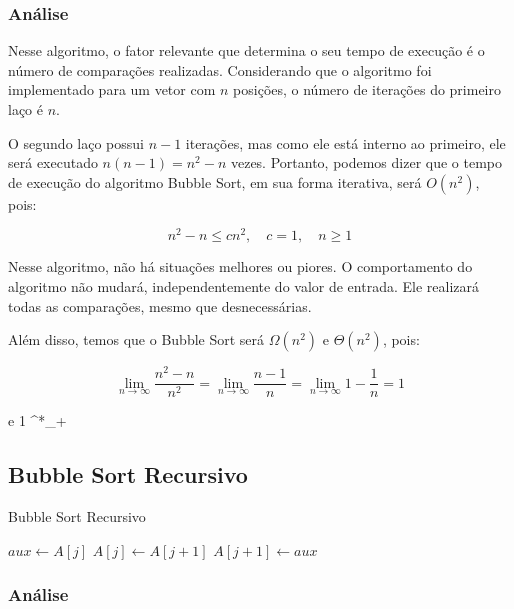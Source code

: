 \subsubsection{Análise}
Nesse algoritmo, o fator relevante que determina o seu tempo de execução é o número de comparações realizadas. Considerando que o algoritmo foi implementado para um vetor com \( n \) posições, o número de iterações do primeiro laço é \( n \).

O segundo laço possui \( n-1 \) iterações, mas como ele está interno ao primeiro, ele será executado \( n(n-1) = n^2 - n \) vezes. Portanto, podemos dizer que o tempo de execução do algoritmo Bubble Sort, em sua forma iterativa, será \( O(n^2) \), pois:

\[
n^2 - n \leq cn^2, \quad c = 1, \quad n \geq 1
\]

Nesse algoritmo, não há situações melhores ou piores. O comportamento do algoritmo não mudará, independentemente do valor de entrada. Ele realizará todas as comparações, mesmo que desnecessárias.

Além disso, temos que o Bubble Sort será \( \Omega(n^2) \) e \( \Theta(n^2) \), pois:

\[
\lim_{n \rightarrow \infty} \frac{n^2 - n}{n^2} =
\lim_{n \rightarrow \infty} \frac{n - 1}{n} =
\lim_{n \rightarrow \infty} 1-\frac{1}{n} =
1
\]

e 1 \in {}^*_+


\newpage

\subsection{Bubble Sort Recursivo}

\begin{algorithm}
    \caption{Bubble Sort Recursivo}
    \label{algo:bubble_sort_recursivo}
    \begin{algorithmic}[1]
        \Statex
                \Return{}
            \EndIf
                    \State $aux \gets A[j]$
                    \State $A[j] \gets A[j + 1]$
                    \State $A[j + 1] \gets aux$
                \EndIf
            \EndFor
            \State {}
        \EndFunction
    \end{algorithmic}
\end{algorithm}

\subsubsection{Análise}










